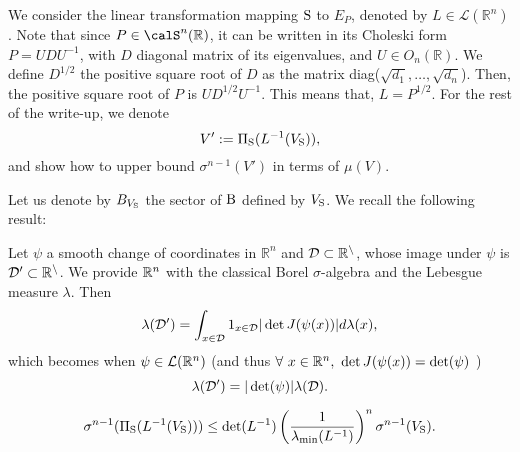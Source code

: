 We consider the linear transformation mapping $\text{S}$ to $E_P$, denoted by $L \in \mathcal{L}(\mathbb{R}^n)$. Note that since $P \in \calS^n(\R)$, it can be written in its Choleski form $P = U D U^{-1}$, with $D$ diagonal matrix of its eigenvalues, and $U \in O_n(\mathbb{R})$. We define $D^{1/2}$ the positive square root of $D$ as the matrix diag($\sqrt{d_1},\dots, \sqrt{d_n}$). Then, the positive square root of $P$ is $U D^{1/2} U^{-1}$. This means that, $L = P^{1/2}$. For the rest of the write-up, we denote $$V':=\Pi_{\text{S}}(L^{-1}(V_{\text{S}})),$$ and show how to upper bound $\sigma^{n-1}(V')$ in terms of $\mu(V)$.


Let us denote by $B_{V_{\text{S}}}$ the sector of $\text{B}$ defined by $V_{\text{S}}$. We recall the following result:

\begin{lemma} 
Let $\psi$ a smooth change of coordinates in $\mathbb{R}^n$ and $\cal{D} \subset \mathbb{R}^n$, whose image under $\psi$ is $\cal{D}' \subset \mathbb{R}^n$. We provide $\mathbb{R}^n$ with the classical Borel $\sigma$-algebra and the Lebesgue measure $\lambda$. Then
\begin{equation}
\lambda(\mathcal{D}') = \int_{x \in \mathcal{D}} 1_{x \in \mathcal{D}} |\det J(\psi(x))| d\lambda(x),
\end{equation}
which becomes when $\psi \in \mathcal{L}(\mathbb{R}^n)$ (and thus $\forall\ x \in \mathbb{R}^n, \ \det J(\psi(x)) = \det(\psi)$ )
\begin{equation}
\lambda(\mathcal{D}') = |\det(\psi)| \lambda(\mathcal{D}).
\end{equation}
\end{lemma}


\begin{theorem} \label{lemma:lip}
\begin{equation}
\sigma^{n-1}(\Pi_{\text{S}}(L^{-1}(V_{\text{S}}))) \leq \det(L^{-1}) \left(\frac{1}{\lambda_{\min}(L^{-1})}\right)^n \sigma^{n-1}(V_{\text{S}}).
\end{equation}   
\end{theorem}

